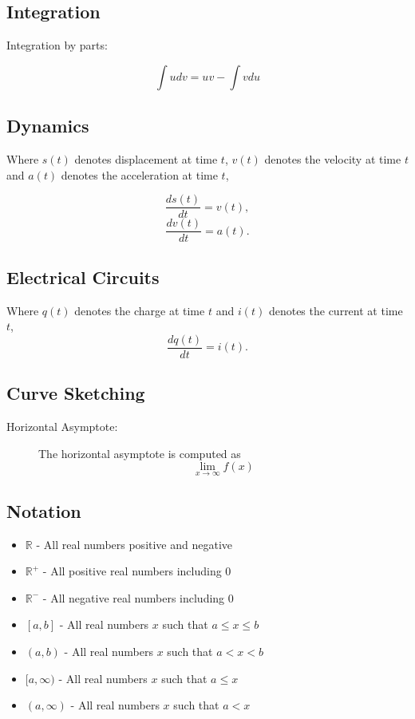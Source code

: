 	\subsection*{Integration}
	
	Integration by parts: 
	
	\[ \int u dv = uv - \int v du \]  
	

	
	\subsection*{Dynamics}
	Where $s(t)$ denotes displacement at time $t$, $v(t)$ denotes the velocity at time $t$ and $a(t)$
	denotes the acceleration at time $t$, 
	\begin{multicols}{2}
	\[  \frac{ds(t)}{dt}  = v(t),\]
	\[  \frac{dv(t)}{dt}  = a(t).\]
	\end{multicols}
	\subsection*{Electrical Circuits}
	Where $q(t)$ denotes the charge at time $t$ and $i(t)$ denotes the current at time $t$,
	\[  \frac{dq(t)}{dt}  = i(t).\]
	


	
	
\subsection*{Curve Sketching}
\begin{description}
	\item[Horizontal Asymptote:] The horizontal asymptote is computed as
		\[ \lim_{x \to \infty } f(x) \]
\end{description}

	
	\subsection*{Notation}


\begin{framed}
	\begin{multicols}{2}
		\begin{itemize}
			\item $\mathbb{R}$ - All real numbers positive and negative
			\item $\mathbb{R}^+$ - All positive real numbers including $0$
			\item $\mathbb{R}^-$ - All negative real numbers including $0$
			\item $[a,b]$ - All real numbers $x$ such that $a \le x \le b$
			\item $(a,b)$ - All real numbers $x$ such that $a < x < b$
			\item $[a,\infty)$ - All real numbers $x$ such that $a \le x$
			\item $(a,\infty)$ - All real numbers $x$ such that $a < x$
		\end{itemize} 
	\end{multicols}
\end{framed}
\newpage

